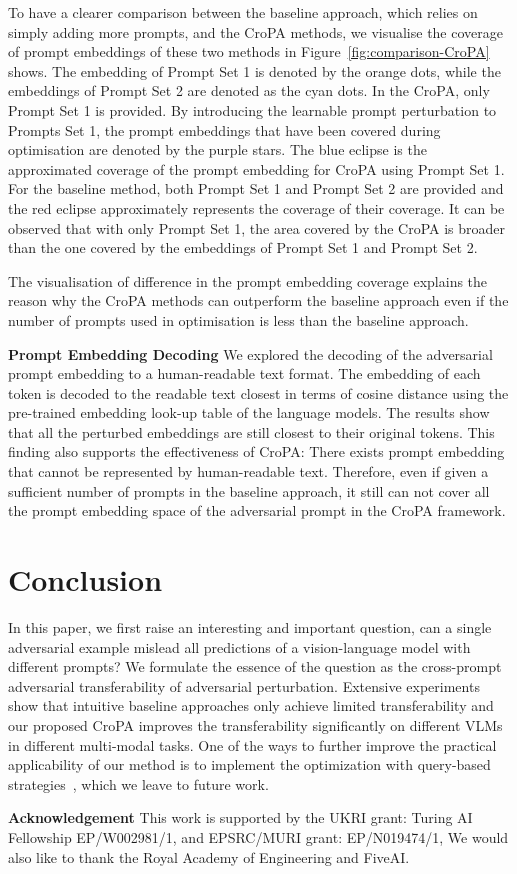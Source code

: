 To have a clearer comparison between the baseline approach, which relies on simply adding more prompts,  and the CroPA methods, we visualise the coverage of prompt embeddings of these two methods in Figure~\ref{fig:comparison-CroPA} shows. The embedding of Prompt Set 1 is denoted by the orange dots, while the embeddings of Prompt Set 2 are denoted as the cyan dots. In the CroPA, only Prompt Set 1 is provided. By introducing the learnable prompt perturbation to Prompts Set 1, the prompt embeddings that have been covered during optimisation are denoted by the purple stars.  The blue eclipse is the approximated coverage of the prompt embedding for CroPA using Prompt Set 1. For the baseline method, both Prompt Set 1 and Prompt Set 2 are provided and the red eclipse approximately represents the coverage of their coverage. It can be observed that with only Prompt Set 1, the area covered by the CroPA is broader than the one covered by the embeddings of Prompt Set 1 and Prompt Set 2. 

The visualisation of difference in the prompt embedding coverage explains the reason why the CroPA methods can outperform the baseline approach even if the number of prompts used in optimisation is less than the baseline approach.

\textbf{Prompt Embedding Decoding} We explored the decoding of the adversarial prompt embedding to a human-readable text format. The embedding of each token is decoded to the readable text closest in terms of cosine distance using the pre-trained embedding look-up table of the language models. The results show that all the perturbed embeddings are still closest to their original tokens. This finding also supports the effectiveness of  CroPA: There exists prompt embedding that cannot be represented by human-readable text. Therefore, even if given a sufficient number of prompts in the baseline approach, it still can not cover all the prompt embedding space of the adversarial prompt in the CroPA framework. 

    
        
       
        
    

\section{Conclusion}
In this paper, we first raise an interesting and important question, can a single adversarial example mislead all predictions of a vision-language model with different prompts? We formulate the essence of the question as the cross-prompt adversarial transferability of adversarial perturbation. Extensive experiments show that intuitive baseline approaches only achieve limited transferability and our proposed CroPA improves the transferability significantly on different VLMs in different multi-modal tasks. One of the ways to further improve the practical applicability of our method is to implement the optimization with query-based strategies~\citep{chen2017zoo,ilyas2018black}, which we leave to future work.

\noindent\textbf{Acknowledgement} This work is supported by the UKRI grant: Turing AI Fellowship EP/W002981/1, and EPSRC/MURI grant: EP/N019474/1, We would also like to thank the Royal Academy of Engineering and FiveAI.

